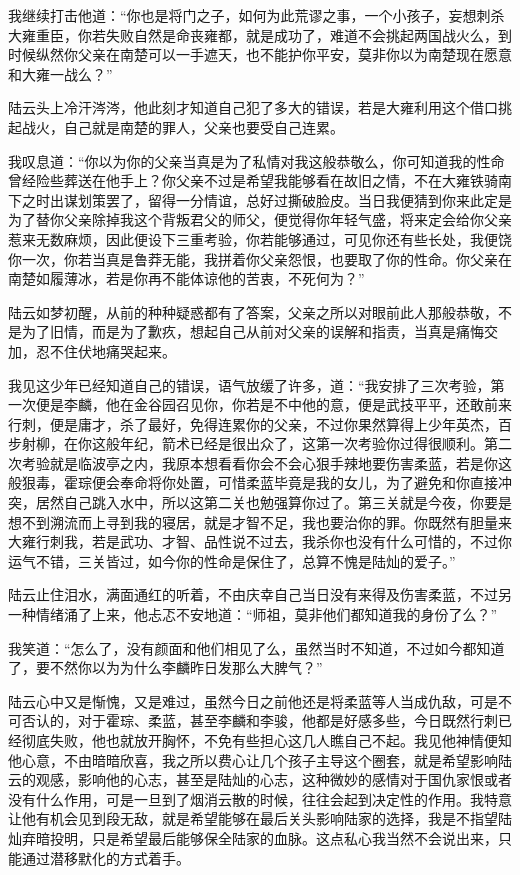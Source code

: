 我继续打击他道：“你也是将门之子，如何为此荒谬之事，一个小孩子，妄想刺杀大雍重臣，你若失败自然是命丧雍都，就是成功了，难道不会挑起两国战火么，到时候纵然你父亲在南楚可以一手遮天，也不能护你平安，莫非你以为南楚现在愿意和大雍一战么？”

陆云头上冷汗涔涔，他此刻才知道自己犯了多大的错误，若是大雍利用这个借口挑起战火，自己就是南楚的罪人，父亲也要受自己连累。

我叹息道：“你以为你的父亲当真是为了私情对我这般恭敬么，你可知道我的性命曾经险些葬送在他手上？你父亲不过是希望我能够看在故旧之情，不在大雍铁骑南下之时出谋划策罢了，留得一分情谊，总好过撕破脸皮。当日我便猜到你来此定是为了替你父亲除掉我这个背叛君父的师父，便觉得你年轻气盛，将来定会给你父亲惹来无数麻烦，因此便设下三重考验，你若能够通过，可见你还有些长处，我便饶你一次，你若当真是鲁莽无能，我拼着你父亲怨恨，也要取了你的性命。你父亲在南楚如履薄冰，若是你再不能体谅他的苦衷，不死何为？”

陆云如梦初醒，从前的种种疑惑都有了答案，父亲之所以对眼前此人那般恭敬，不是为了旧情，而是为了歉疚，想起自己从前对父亲的误解和指责，当真是痛悔交加，忍不住伏地痛哭起来。

我见这少年已经知道自己的错误，语气放缓了许多，道：“我安排了三次考验，第一次便是李麟，他在金谷园召见你，你若是不中他的意，便是武技平平，还敢前来行刺，便是庸才，杀了最好，免得连累你的父亲，不过你果然算得上少年英杰，百步射柳，在你这般年纪，箭术已经是很出众了，这第一次考验你过得很顺利。第二次考验就是临波亭之内，我原本想看看你会不会心狠手辣地要伤害柔蓝，若是你这般狠毒，霍琮便会奉命将你处置，可惜柔蓝毕竟是我的女儿，为了避免和你直接冲突，居然自己跳入水中，所以这第二关也勉强算你过了。第三关就是今夜，你要是想不到溯流而上寻到我的寝居，就是才智不足，我也要治你的罪。你既然有胆量来大雍行刺我，若是武功、才智、品性说不过去，我杀你也没有什么可惜的，不过你运气不错，三关皆过，如今你的性命是保住了，总算不愧是陆灿的爱子。”

陆云止住泪水，满面通红的听着，不由庆幸自己当日没有来得及伤害柔蓝，不过另一种情绪涌了上来，他忐忑不安地道：“师祖，莫非他们都知道我的身份了么？”

我笑道：“怎么了，没有颜面和他们相见了么，虽然当时不知道，不过如今都知道了，要不然你以为为什么李麟昨日发那么大脾气？”

陆云心中又是惭愧，又是难过，虽然今日之前他还是将柔蓝等人当成仇敌，可是不可否认的，对于霍琮、柔蓝，甚至李麟和李骏，他都是好感多些，今日既然行刺已经彻底失败，他也就放开胸怀，不免有些担心这几人瞧自己不起。我见他神情便知他心意，不由暗暗欣喜，我之所以费心让几个孩子主导这个圈套，就是希望影响陆云的观感，影响他的心志，甚至是陆灿的心志，这种微妙的感情对于国仇家恨或者没有什么作用，可是一旦到了烟消云散的时候，往往会起到决定性的作用。我特意让他有机会见到段无敌，就是希望能够在最后关头影响陆家的选择，我是不指望陆灿弃暗投明，只是希望最后能够保全陆家的血脉。这点私心我当然不会说出来，只能通过潜移默化的方式着手。

